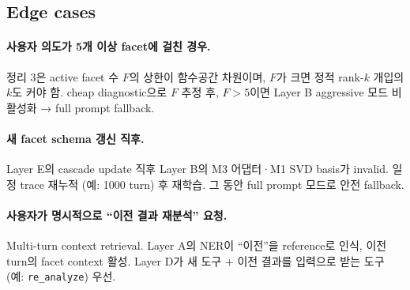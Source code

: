 \documentclass[11pt]{article}
\theoremstyle{definition}
\begin{document}
\subsection{Edge cases}

\paragraph{사용자 의도가 5개 이상 facet에 걸친 경우.}
정리 3은 active facet 수 $F$의 상한이 함수공간 차원이며, $F$가 크면 정적 rank-$k$ 개입의 $k$도 커야 함. cheap diagnostic으로 $F$ 추정 후, $F > 5$이면 Layer B aggressive 모드 비활성화 → full prompt fallback.

\paragraph{새 facet schema 갱신 직후.}
Layer E의 cascade update 직후 Layer B의 M3 어댑터·M1 SVD basis가 invalid. 일정 trace 재누적 (예: 1000 turn) 후 재학습. 그 동안 full prompt 모드로 안전 fallback.

\paragraph{사용자가 명시적으로 ``이전 결과 재분석'' 요청.}
Multi-turn context retrieval. Layer A의 NER이 ``이전''을 reference로 인식, 이전 turn의 facet context 활성. Layer D가 새 도구 + 이전 결과를 입력으로 받는 도구 (예: \texttt{re\_analyze}) 우선.
\end{document}
